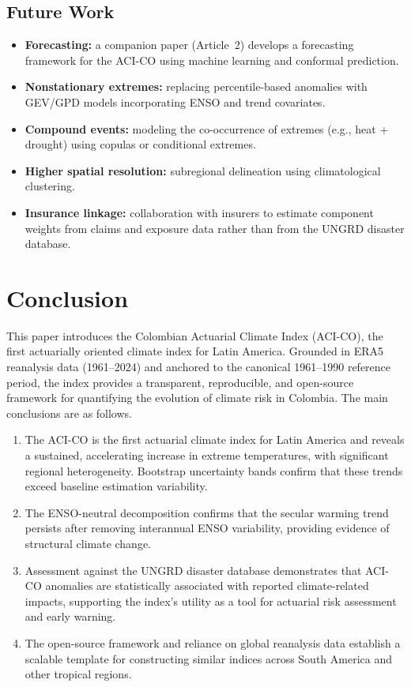 \documentclass[12pt]{article}
\begin{document}
\subsection{Future Work}
 
\begin{itemize}
\item \textbf{Forecasting:} a companion paper (Article~2) develops a forecasting framework for the ACI-CO using machine learning and conformal prediction.
\item \textbf{Nonstationary extremes:} replacing percentile-based anomalies with GEV/GPD models incorporating ENSO and trend covariates.
\item \textbf{Compound events:} modeling the co-occurrence of extremes (e.g., heat + drought) using copulas or conditional extremes.
\item \textbf{Higher spatial resolution:} subregional delineation using climatological clustering.
\item \textbf{Insurance linkage:} collaboration with insurers to estimate component weights from claims and exposure data rather than from the UNGRD disaster database.
\end{itemize}
 
\section{Conclusion}\label{sec:conclusion}
 
This paper introduces the Colombian Actuarial Climate Index (ACI-CO), the first
actuarially oriented climate index for Latin America.
Grounded in ERA5 reanalysis data (1961--2024) and anchored to the canonical
1961--1990 reference period, the index provides a transparent, reproducible,
and open-source framework for quantifying the evolution of climate risk in
Colombia. The main conclusions are as follows.
 
\begin{enumerate}
\item The ACI-CO is the first actuarial climate index for Latin America and reveals a sustained, accelerating increase in extreme temperatures, with significant regional heterogeneity. Bootstrap uncertainty bands confirm that these trends exceed baseline estimation variability.
\item The ENSO-neutral decomposition confirms that the secular warming trend persists after removing interannual ENSO variability, providing evidence of structural climate change.
\item Assessment against the UNGRD disaster database demonstrates that ACI-CO anomalies are statistically associated with reported climate-related impacts, supporting the index's utility as a tool for actuarial risk assessment and early warning.
\item The open-source framework and reliance on global reanalysis data establish a scalable template for constructing similar indices across South America and other tropical regions.
\end{enumerate}
 
\end{document}
